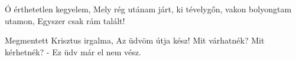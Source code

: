 Ó érthetetlen kegyelem,
Mely rég utánam járt,
ki tévelygőn, vakon bolyongtam utamon,
Egyszer csak rám talált!

Megmentett Krisztus irgalma,
Az üdvöm útja kész!
Mit várhatnék? Mit kérhetnék? -
Ez üdv már el nem vész.
